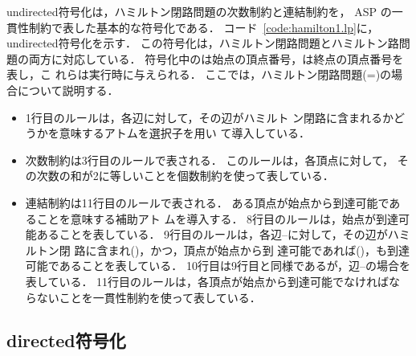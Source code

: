

\textsf{undirected}符号化は，ハミルトン閉路問題の次数制約と連結制約を，
ASP の一貫性制約で表した基本的な符号化である．
コード~\ref{code:hamilton1.lp}に，\textsf{undirected}符号化を示す．
この符号化は，ハミルトン閉路問題とハミルトン路問題の両方に対応している．
符号化中のは始点の頂点番号，は終点の頂点番号を表し，こ
れらは実行時に与えられる．
ここでは，ハミルトン閉路問題(=)の場合について説明する．

\begin{itemize}
\item 1行目のルールは，各辺に対して，その辺がハミルト
  ン閉路に含まれるかどうかを意味するアトムを選択子を用い
  て導入している．
\item 次数制約は3行目のルールで表される．
  このルールは，各頂点に対して，
  その次数の和が2に等しいことを個数制約を使って表している．
\item 連結制約は11行目のルールで表される．
ある頂点が始点から到達可能であることを意味する補助アト
ムを導入する．
8行目のルールは，始点が到達可能あることを表している．
9行目のルールは，各辺--に対して，その辺がハミルトン閉
路に含まれ()，かつ，頂点が始点から到
達可能であれば()，も到達可能であることを表している．
10行目は9行目と同様であるが，辺--の場合を表している．
11行目のルールは，各頂点が始点から到達可能でなければな
らないことを一貫性制約を使って表している．
\end{itemize}

\subsection{\textsf{directed}符号化}



